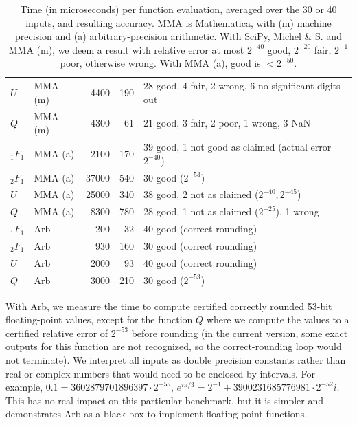 \documentclass[11pt,a4paper]{article}
\begin{document}
\begin{table}
\begin{center}
\begin{scriptsize}
\begin{tabular}{l l | r r | l}
$U$       & MMA (m)       & 4400      & 190   &  28 good, 4 fair, 2 wrong, 6 no significant digits out \\
$Q$       & MMA (m)       & 4300      &   61  &  21 good, 3 fair, 2 poor, 1 wrong, 3 NaN \\
\hline
${}_1F_1$ & MMA (a)       & 2100      & 170   & 39 good, 1 not good as claimed (actual error $2^{-40}$) \\
${}_2F_1$ & MMA (a)       & 37000     & 540   & 30 good ($2^{-53}$) \\
$U$       & MMA (a)       & 25000     & 340   & 38 good, 2 not as claimed ($2^{-40}, 2^{-45}$) \\
$Q$       & MMA (a)       & 8300      & 780   & 28 good, 1 not as claimed ($2^{-25}$), 1 wrong \\
\hline
${}_1F_1$ & Arb           &  200      & 32    & 40 good (correct rounding) \\
${}_2F_1$ & Arb           &  930      & 160   & 30 good (correct rounding) \\
$U$       & Arb           & 2000      & 93    & 40 good (correct rounding) \\
$Q$       & Arb           & 3000      & 210   & 30 good ($2^{-53}$) \\
\end{tabular}
\end{scriptsize}
\caption{Time (in microseconds) per function evaluation, averaged over the 30 or 40 inputs, and resulting accuracy.
MMA is Mathematica, with (m) machine precision and (a) arbitrary-precision arithmetic.
With SciPy, Michel \& S. and MMA (m), we deem a result with relative error at most $2^{-40}$ good,
$2^{-20}$ fair, $2^{-1}$ poor, otherwise wrong. With MMA (a), good is $<2^{-50}$.}
\label{tab:pearson2}
\end{center}
\end{table}

With Arb, we measure the time to compute certified correctly rounded 53-bit
floating-point values, except for the function $Q$ where we compute
the values to a certified relative error of $2^{-53}$ before
rounding (in the current version,
some exact outputs for this function are not recognized,
so the correct-rounding loop would not terminate).
We interpret all inputs as double precision constants rather than
real or complex numbers that would need to be enclosed by intervals.
For example, $0.1 = 3602879701896397 \cdot 2^{-55}$, $e^{i \pi/3} = 2^{-1} + 3900231685776981 \cdot 2^{-52} i$.
This has no real impact on this particular benchmark, but it is
simpler and demonstrates Arb as a black box to implement floating-point functions.
\end{document}
